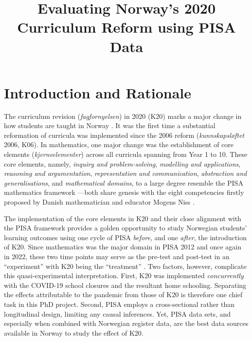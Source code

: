 \documentclass[
    a4paper,                %
    11pt,                   %
    stu,                    %
    donotrepeattitle,       %
    floatsintext,           %
    biblatex,               %
    colorlinks=true,        %
    linkcolor=red,          %
    anchorcolor=black,      %
    citecolor=blue,         %
    urlcolor=blue,          %
    bookmarks=true,         %
    bookmarksopen=false,    %
    bookmarksnumbered=true, %
    dvipsnames              %
]{apa7}
\title{Evaluating Norway's 2020 Curriculum Reform using PISA Data}
\begin{document}
\maketitle

\section{Introduction and Rationale}

The curriculum revision (\textit{fagfornyelsen}) in 2020 (K20) marks a major change in how students are taught in Norway \parencite{udir:2020}. It was the first time a substantial reformation of curricula was implemented since the 2006 reform (\textit{kunnskapsl{\o}ftet} 2006, K06). In mathematics, one major change was the establishment of core elements (\textit{kjerneelementer}) across all curricula spanning from Year 1 to 10. These core elements, namely, \textit{inquiry and problem-solving}, \textit{modelling and applications}, \textit{reasoning and argumentation}, \textit{representation and communication}, \textit{abstraction and generalisations}, and \textit{mathematical domains}, to a large degree resemble the PISA mathematics framework \parencite{oecd:2018}---both share genesis with the eight competencies firstly proposed by Danish mathematician and educator Mogens Niss \parencite{niss:2003,niss:2011,niss:2019}.

The implementation of the core elements in K20 and their close alignment with the PISA framework provides a golden opportunity to study Norwegian students' learning outcomes using one cycle of PISA \emph{before}, and one \emph{after}, the introduction of K20. Since mathematics was the major domain in PISA 2012 and once again in 2022, these two time points may serve as the pre-test and post-test in an ``experiment'' with K20 being the ``treatment'' \parencite{shadish:2002}. Two factors, however, complicate this quasi-experimental interpretation. First, K20 was implemented \emph{concurrently} with the COVID-19 school closures and the resultant home schooling. Separating the effects attributable to the pandemic from those of K20 is therefore one chief task in this PhD project. Second, PISA employs a cross-sectional rather than longitudinal design, limiting any causal inferences. Yet, PISA data sets, and especially when combined with Norwegian register data, are the best data sources available in Norway to study the effect of K20.
\end{document}
